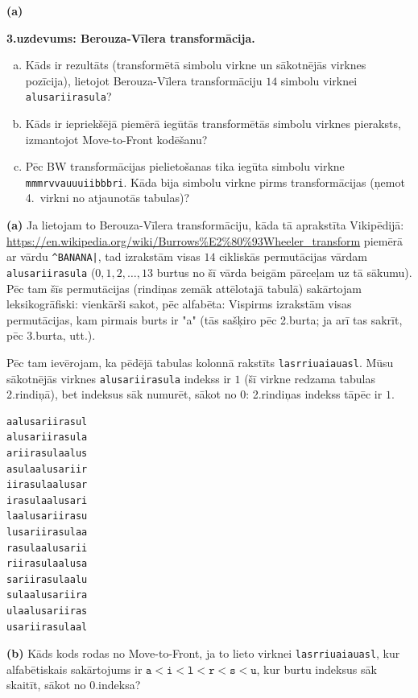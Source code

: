 \documentclass[11pt]{article}
\begin{document}
\noindent
{\bf (a)} 





{\footnotesize
\vspace{10ex}
\noindent
{\bf 3.uzdevums: Berouza-Vīlera transformācija.}
\begin{enumerate}[(a)]
\item 
Kāds ir rezultāts (transformētā simbolu virkne un sākotnējās virknes pozīcija), 
lietojot Berouza-Vīlera transformāciju 
$14$ simbolu virknei {\tt alusariirasula}?
\item Kāds ir iepriekšējā piemērā iegūtās transformētās simbolu virknes pieraksts,
izmantojot Move-to-Front kodēšanu?
\item Pēc BW transformācijas pielietošanas tika iegūta simbolu virkne 
{\tt mmmrvvauuuiibbbri}. Kāda bija simbolu virkne pirms 
transformācijas (ņemot 4.\ virkni
no atjaunotās tabulas)?
\end{enumerate}
}


\noindent
{\bf (a)} Ja lietojam to Berouza-Vīlera transformāciju, kāda tā aprakstīta 
Vikipēdijā: \url{https://en.wikipedia.org/wiki/Burrows%E2%80%93Wheeler_transform} 
\textendash piemērā ar vārdu {\tt \^{}BANANA|}, tad 
izrakstām visas $14$ cikliskās permutācijas vārdam {\tt alusariirasula}
($0,1,2,\ldots,13$ burtus no šī vārda beigām pārceļam uz tā sākumu). Pēc tam 
šīs permutācijas (rindiņas zemāk attēlotajā tabulā) sakārtojam leksikogrāfiski: 
vienkārši sakot, pēc alfabēta: Vispirms izrakstām visas permutācijas, kam
pirmais burts ir "a" (tās sašķiro pēc 2.burta; ja arī tas sakrīt, pēc 3.burta, utt.). 

Pēc tam ievērojam, ka pēdējā tabulas kolonnā rakstīts  {\tt lasrriuaiauasl}. 
Mūsu sākotnējās virknes {\tt alusariirasula} indekss ir $1$ (šī 
virkne redzama tabulas 2.rindiņā), bet indeksus sāk
numurēt, sākot no $0$: 2.rindiņas indekss tāpēc ir $1$. 

\begin{verbatim}
aalusariirasul
alusariirasula
ariirasulaalus
asulaalusariir
iirasulaalusar
irasulaalusari
laalusariirasu
lusariirasulaa
rasulaalusarii
riirasulaalusa
sariirasulaalu
sulaalusariira
ulaalusariiras
usariirasulaal
\end{verbatim}

\noindent
{\bf (b)} Kāds kods rodas no Move-to-Front, ja to lieto 
virknei {\tt lasrriuaiauasl}, kur alfabētiskais
sakārtojums ir $\mathtt{a}<\mathtt{i}<\mathtt{l}<\mathtt{r}<\mathtt{s}<\mathtt{u}$, kur burtu indeksus sāk skaitīt, 
sākot no 0.indeksa?
\end{document}
